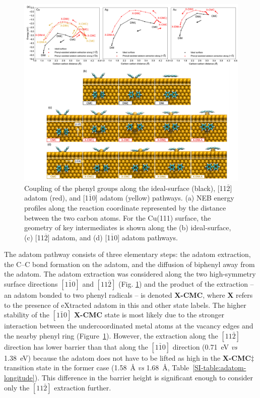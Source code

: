 \documentclass[aps,prb,amsmath,amssymb,11pt]{revtex4-1}
\newcommand{\zhzh}{\color{blue}}
\begin{document}
\begin{figure}[bt]
\centering
\includegraphics[width=1.0\textwidth]{Fig/distance-energy.pdf}
\caption{Coupling of the phenyl groups along the ideal-surface (black),  [11$\overline{2}$] adatom (red), and  [1$\overline{1}$0] adatom (yellow) pathways. (a) NEB energy profiles along the reaction coordinate represented by the distance between the two carbon atoms. For the Cu(111) surface, the geometry of key intermediates is shown along the (b) ideal-surface, (c) [11$\overline{2}$] adatom, and (d) [1$\overline{1}$0] adatom pathways.}
\label{fig:distance-energy}
\end{figure}

The adatom pathway consists of three elementary steps: the adatom extraction, the C--C bond formation on the adatom, and the diffusion of biphenyl away from the adatom. 
The adatom extraction was considered along the two high-symmetry surface directions $[1\bar{1}0]$ and $[11\bar{2}]$ (Fig. \ref{fig:distance-energy}) and the product of the extraction -- an adatom bonded to two phenyl radicals -- is denoted \textbf{X-CMC}, where \textbf{X} refers to the presence of eXtracted adatom in this and other state labels. 
The higher stability of the $[1\bar{1}0]$ \textbf{X-CMC} state is most likely due to the stronger interaction between the undercoordinated metal atoms at the vacancy edges and the nearby phenyl ring (Figure~\ref{fig:distance-energy}).
However, the extraction along the $[11\bar{2}]$ direction has lower barrier than that along the $[1\bar{1}0]$ direction (\SI{0.71}{\electronvolt} \emph{vs} \SI{1.38}{\electronvolt}) because the adatom does not have to be lifted as high in the \textbf{X-CMC$\ddagger$} transition state in the former case (\SI{1.58}{\angstrom} \emph{vs} \SI{1.68}{\angstrom}, Table~\ref{SI-table:adatom-longitude}). This difference in the barrier height is significant enough to consider only the $[11\bar{2}]$ extraction further.
\end{document}
